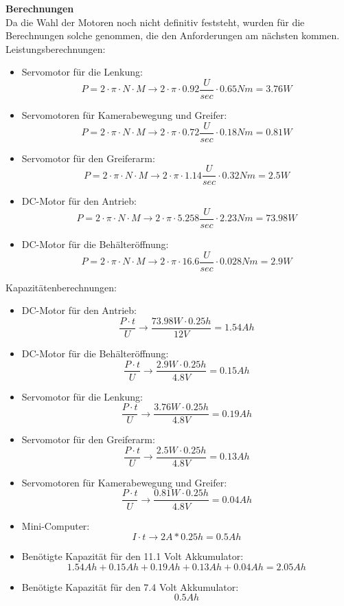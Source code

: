 \textbf{Berechnungen}\\[0.2cm]
Da die Wahl der Motoren noch nicht definitiv feststeht, wurden für die Berechnungen solche genommen, die den Anforderungen am nächsten kommen.\\
Leistungsberechnungen:
\begin{itemize}
\item Servomotor für die Lenkung:
\[
P=2\cdot \pi\cdot N\cdot M \to 2\cdot \pi\cdot 0.92\frac{U}{sec}\cdot 0.65Nm = 3.76W
\]
\item Servomotoren für Kamerabewegung und Greifer:
\[
P=2\cdot \pi\cdot N\cdot M \to 2\cdot \pi\cdot 0.72\frac{U}{sec}\cdot 0.18Nm = 0.81W
\]
\item Servomotor für den Greiferarm:
\[
P=2\cdot \pi\cdot N\cdot M \to 2\cdot \pi\cdot 1.14\frac{U}{sec}\cdot 0.32Nm = 2.5W
\]
\item DC-Motor für den Antrieb:
\[
P=2\cdot \pi\cdot N\cdot M \to 2\cdot \pi\cdot 5.258\frac{U}{sec}\cdot 2.23Nm = 73.98W
\]
\item DC-Motor für die Behälteröffnung:
\[
P=2\cdot \pi\cdot N\cdot M \to 2\cdot \pi\cdot 16.6\frac{U}{sec}\cdot 0.028Nm = 2.9W
\]
\end{itemize}
\newpage
Kapazitätenberechnungen:
\begin{itemize}
\item DC-Motor für den Antrieb:
\[
\frac{P\cdot t}{U} \to \frac{73.98W\cdot0.25h}{12V}= 1.54 Ah
\]
\item DC-Motor für die Behälteröffnung:
\[
\frac{P\cdot t}{U} \to \frac{2.9W\cdot0.25h}{4.8V}= 0.15 Ah
\]
\item Servomotor für die Lenkung:
\[
\frac{P\cdot t}{U} \to \frac{3.76W\cdot0.25h}{4.8V}= 0.19 Ah
\]
\item Servomotor für den Greiferarm:
\[
\frac{P\cdot t}{U} \to \frac{2.5W\cdot0.25h}{4.8V}= 0.13 Ah
\]
\item Servomotoren für Kamerabewegung und Greifer:
\[
\frac{P\cdot t}{U} \to \frac{0.81W\cdot0.25h}{4.8V}= 0.04 Ah
\]
\item Mini-Computer:
\[
I\cdot t \to 2A*0.25h = 0.5 Ah
\]
\item Benötigte Kapazität für den 11.1 Volt Akkumulator:
\[
1.54Ah+0.15Ah+0.19Ah+0.13Ah+0.04Ah = 2.05Ah
\]
\item Benötigte Kapazität für den 7.4 Volt Akkumulator:
\[
0.5Ah
\]
\end{itemize}
